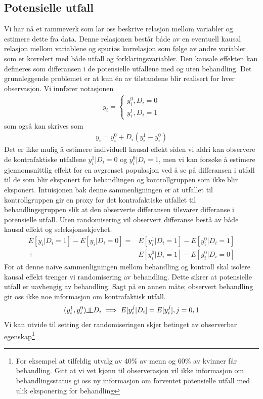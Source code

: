 \subsection{Potensielle utfall}
Vi har nå et rammeverk som lar oss beskrive relasjon mellom variabler og estimere dette fra data. Denne relasjonen består både av en eventuell kausal relasjon mellom variablene og spuriøs korrelasjon som følge av andre variabler som er korrelert med både utfall og forklaringsvariabler. Den kausale effekten kan defineres som differansen i de potensielle utfallene med og uten behandling. Det grunnleggende problemet er at kun én av tilstandene blir realisert for hver observasjon. Vi innfører notasjonen
\begin{align}
y_i = 
\begin{cases}
y_i^0, D_i = 0 \\
y_i^1, D_i = 1 
\end{cases}
\end{align}
som også kan skrives som
\begin{align}
y_i=y_i^0+D_i(y_i^1-y_i^0)
\end{align}
Det er ikke mulig å estimere individuell kausal effekt siden vi aldri kan observere de kontrafaktiske utfallene $y_i^1|D_i=0$ og $y_i^0|D_i=1$, men vi kan forsøke å estimere gjennomsnittlig effekt for en avgrenset populasjon ved å se på differansen i utfall til de som blir eksponert for behandlingen og kontrollgruppen som ikke blir eksponert. Intuisjonen bak denne sammenligningen er at utfallet til kontrollgruppen gir en proxy for det kontrafaktiske utfallet til behandlingsgruppen slik at den observerte differansen tilsvarer differanse i potensielle utfall. Uten randomisering vil observert differanse bestå av både kausal effekt og seleksjonsskjevhet.
\begin{align}
E[y_i|D_i=1]-E[y_i|D_i=0] =& E[y_i^1|D_i=1]-E[y_i^0|D_i=1] \\
+& E[y_i^0|D_i=1]-E[y_i^0|D_i=0]
\end{align}
For at denne naive sammenligningen mellom behandling og kontroll skal isolere kausal effekt trenger vi randomisering av behandling. Dette sikrer at potensielle utfall er uavhengig av behandling. Sagt på en annen måte; observert behandling gir oss ikke noe informasjon om kontrafaktisk utfall.
\begin{align}
(y_i^1,y_i^0) \indep D_i \implies E[y_i^j|D_i]=E[y_i^j], j=0,1
\end{align}
Vi kan utvide til setting der randomiseringen skjer betinget av observerbar egenskap\footnote{For eksempel at tilfeldig utvalg av 40\% av menn og 60\% av kvinner får behandling. Gitt at vi vet kjønn til observerasjon vil ikke informasjon om behandlingsstatus gi oss ny informasjon om forventet potensielle utfall med ulik eksponering for behandling}
